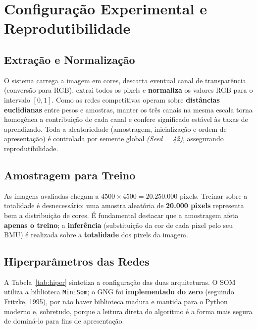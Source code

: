 \documentclass[11pt,a4paper]{article}
\begin{document}
\section{Configuração Experimental e Reprodutibilidade}

\subsection{Extração e Normalização}
O sistema carrega a imagem em cores, descarta eventual canal de transparência (conversão para RGB), extrai todos os pixels e \textbf{normaliza} os valores RGB para o intervalo $[0, 1]$. Como as redes competitivas operam sobre \textbf{distâncias euclidianas} entre pesos e amostras, manter os três canais na mesma escala torna homogênea a contribuição de cada canal e confere significado estável às taxas de aprendizado. Toda a aleatoriedade (amostragem, inicialização e ordem de apresentação) é controlada por semente global \textit{(Seed = 42)}, assegurando reprodutibilidade.

\subsection{Amostragem para Treino}
As imagens avaliadas chegam a $4500 \times 4500 = 20{.}250{.}000$ pixels. Treinar sobre a totalidade é desnecessário: uma amostra aleatória de \textbf{20.000 pixels} representa bem a distribuição de cores. É fundamental destacar que a amostragem afeta \textbf{apenas o treino}; a \textbf{inferência} (substituição da cor de cada pixel pelo seu BMU) é realizada sobre a \textbf{totalidade} dos pixels da imagem.

\subsection{Hiperparâmetros das Redes}
A Tabela~\ref{tab:hiper} sintetiza a configuração das duas arquiteturas. O SOM utiliza a biblioteca \texttt{MiniSom}; o GNG foi \textbf{implementado do zero} (seguindo Fritzke, 1995), por não haver biblioteca madura e mantida para o Python moderno e, sobretudo, porque a leitura direta do algoritmo é a forma mais segura de dominá-lo para fins de apresentação.
\end{document}
